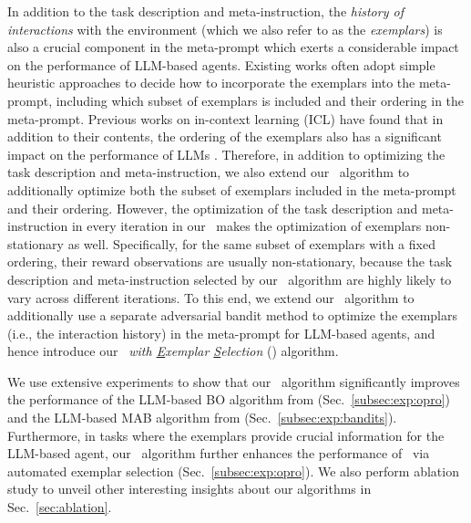 In addition to the task description and meta-instruction, the \emph{history of interactions} with the environment (which we also refer to as the \emph{exemplars}) is also a crucial component in the meta-prompt which exerts a considerable impact on the performance of LLM-based agents.
Existing works often adopt simple heuristic approaches to decide how to incorporate the exemplars into the meta-prompt, including which subset of exemplars is included and their ordering in the meta-prompt.
Previous works on in-context learning (ICL) have found that in addition to their contents, the ordering of the exemplars also has a significant impact on the performance of LLMs \cite{lu2022fantastically}. 
Therefore, in addition to optimizing the task description and meta-instruction, we also extend our \alg~algorithm to additionally optimize both the subset of exemplars included in the meta-prompt and their ordering.
However, the optimization of the task description and meta-instruction in every iteration in our \alg~makes the optimization of exemplars non-stationary as well. Specifically, for the same subset of exemplars with a fixed ordering, their reward observations are usually non-stationary, because the task description and meta-instruction selected by our \alg~algorithm are highly likely to vary across different iterations.
To this end, we extend our \alg~algorithm to additionally use a separate adversarial bandit method to optimize the exemplars (i.e., the interaction history) in the meta-prompt for LLM-based agents, and hence introduce our \emph{\alg~with \underline{E}xemplar \underline{S}election} (\alges) algorithm.

We use extensive experiments to show that our \alg~algorithm significantly improves the performance of the LLM-based BO algorithm from \citet{yang2023large} (Sec.~\ref{subsec:exp:opro}) and the LLM-based MAB algorithm from \citet{krishnamurthy2024can} (Sec.~\ref{subsec:exp:bandits}).
Furthermore, in tasks where the exemplars 
provide crucial information for the LLM-based agent, our \alges~algorithm further enhances the performance of \alg~via automated exemplar selection (Sec.~\ref{subsec:exp:opro}).
We also perform ablation study to unveil other interesting insights about our algorithms in Sec.~\ref{sec:ablation}.
